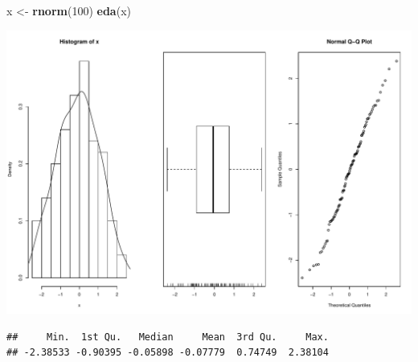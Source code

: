 \documentclass[ignorenonframetext,]{beamer}
\newenvironment{Shaded}{\begin{snugshade}}{\end{snugshade}}
\newcommand{\KeywordTok}[1]{\textcolor[rgb]{0.13,0.29,0.53}{\textbf{#1}}}
\newcommand{\DecValTok}[1]{\textcolor[rgb]{0.00,0.00,0.81}{#1}}
\newcommand{\StringTok}[1]{\textcolor[rgb]{0.31,0.60,0.02}{#1}}
\newcommand{\NormalTok}[1]{#1}
\begin{document}
\begin{frame}[fragile]

\begin{Shaded}
\begin{Highlighting}[]
\NormalTok{x <-}\StringTok{ }\KeywordTok{rnorm}\NormalTok{(}\DecValTok{100}\NormalTok{)}
\KeywordTok{eda}\NormalTok{(x)}
\end{Highlighting}
\end{Shaded}

\includegraphics{lect2_files/figure-beamer/unnamed-chunk-22-1.pdf}

\begin{verbatim}
##     Min.  1st Qu.   Median     Mean  3rd Qu.     Max. 
## -2.38533 -0.90395 -0.05898 -0.07779  0.74749  2.38104
\end{verbatim}

\end{frame}
\end{document}
